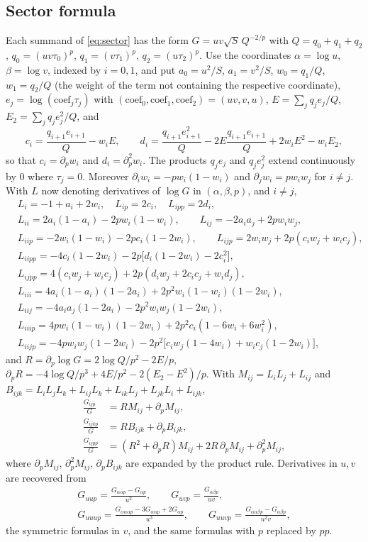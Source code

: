 \documentclass[11pt]{amsart}
\theoremstyle{definition}
\theoremstyle{remark}
\numberwithin{equation}{section}
\begin{document}
\subsection{Sector formula}\label{app:sector}
Each summand of \eqref{eq:sector} has the form $G=uv\sqrt S\,Q^{-2/p}$ with $Q=q_0+q_1+q_2$, $q_0=(uv\tau_0)^p$, $q_1=(v\tau_1)^p$, $q_2=(u\tau_2)^p$. Use the coordinates $\alpha=\log u$, $\beta=\log v$, indexed by $i=0,1$, and put $a_0=u^2/S$, $a_1=v^2/S$, $w_0=q_1/Q$, $w_1=q_2/Q$ (the weight of the term not containing the respective coordinate), $e_j=\log(\mathrm{coef}_j\tau_j)$ with $(\mathrm{coef}_0,\mathrm{coef}_1,\mathrm{coef}_2)=(uv,v,u)$, $E=\sum_jq_je_j/Q$, $E_2=\sum_jq_je_j^2/Q$, and
\[
c_i=\frac{q_{i+1}e_{i+1}}Q-w_iE,\qquad d_i=\frac{q_{i+1}e_{i+1}^2}{Q}-2E\frac{q_{i+1}e_{i+1}}Q+2w_iE^2-w_iE_2,
\]
so that $c_i=\partial_pw_i$ and $d_i=\partial_p^2w_i$. The products $q_je_j$ and $q_je_j^2$ extend continuously by $0$ where $\tau_j=0$. Moreover $\partial_iw_i=-pw_i(1-w_i)$ and $\partial_jw_i=pw_iw_j$ for $i\ne j$. With $L$ now denoting derivatives of $\log G$ in $(\alpha,\beta,p)$, and $i\ne j$,
\[
\begin{aligned}
&L_i=-1+a_i+2w_i,\quad L_{ip}=2c_i,\quad L_{ipp}=2d_i,\\
&L_{ii}=2a_i(1-a_i)-2pw_i(1-w_i),\qquad L_{ij}=-2a_ia_j+2pw_iw_j,\\
&L_{iip}=-2w_i(1-w_i)-2pc_i(1-2w_i),\qquad L_{ijp}=2w_iw_j+2p(c_iw_j+w_ic_j),\\
&L_{iipp}=-4c_i(1-2w_i)-2p\bigl[d_i(1-2w_i)-2c_i^2\bigr],\\
&L_{ijpp}=4(c_iw_j+w_ic_j)+2p(d_iw_j+2c_ic_j+w_id_j),\\
&L_{iii}=4a_i(1-a_i)(1-2a_i)+2p^2w_i(1-w_i)(1-2w_i),\\
&L_{iij}=-4a_ia_j(1-2a_i)-2p^2w_iw_j(1-2w_i),\\
&L_{iiip}=4pw_i(1-w_i)(1-2w_i)+2p^2c_i(1-6w_i+6w_i^2),\\
&L_{iijp}=-4pw_iw_j(1-2w_i)-2p^2\bigl[c_iw_j(1-4w_i)+w_ic_j(1-2w_i)\bigr],
\end{aligned}
\]
and $R=\partial_p\log G=2\log Q/p^2-2E/p$, $\partial_pR=-4\log Q/p^3+4E/p^2-2(E_2-E^2)/p$. With $M_{ij}=L_iL_j+L_{ij}$ and $B_{ijk}=L_iL_jL_k+L_{ij}L_k+L_{ik}L_j+L_{jk}L_i+L_{ijk}$,
\[
\begin{aligned}
\frac{G_{ijp}}G&=RM_{ij}+\partial_pM_{ij},\\
\frac{G_{ijkp}}G&=RB_{ijk}+\partial_pB_{ijk},\\
\frac{G_{ijpp}}G&=(R^2+\partial_pR)M_{ij}+2R\,\partial_pM_{ij}+\partial_p^2M_{ij},
\end{aligned}
\]
where $\partial_pM_{ij}$, $\partial_p^2M_{ij}$, $\partial_pB_{ijk}$ are expanded by the product rule. Derivatives in $u,v$ are recovered from
\[
\begin{gathered}
G_{uup}=\frac{G_{\alpha\alpha p}-G_{\alpha p}}{u^2},\qquad G_{uvp}=\frac{G_{\alpha\beta p}}{uv},\\
G_{uuup}=\frac{G_{\alpha\alpha\alpha p}-3G_{\alpha\alpha p}+2G_{\alpha p}}{u^3},\qquad G_{uuvp}=\frac{G_{\alpha\alpha\beta p}-G_{\alpha\beta p}}{u^2v},
\end{gathered}
\]
the symmetric formulas in $v$, and the same formulas with $p$ replaced by $pp$.
\end{document}
